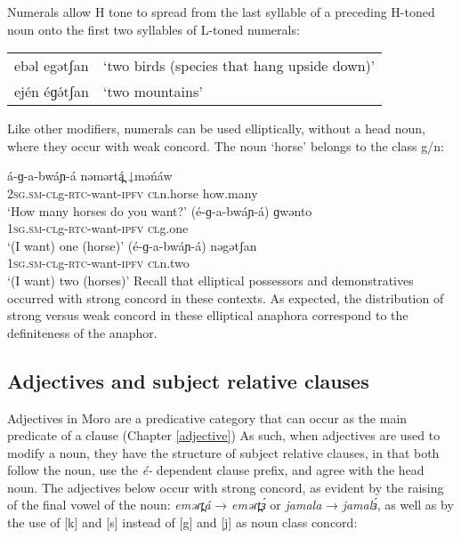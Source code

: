 Numerals allow H tone to spread from the last syllable of a preceding H-toned noun onto the first two syllables of L-toned numerals:

\ea \begin{tabular}[t]{ll}
	 ebəl egətʃan &	‘two birds (species that hang upside down)’ \\
	 ején éɡə́tʃan &	‘two mountains’ 	 \\
 \end{tabular}
 \z 


Like other modifiers, numerals can be used elliptically, without a head noun, where they occur with weak concord. The noun ‘horse’ belongs to the class g/n:

\ea 
	\ea \gll	á-ɡ-a-bwáɲ-á 				nəmərtá̪ 	↓məńáw\\
				2\textsc{sg}.\textsc{sm}-\textsc{cl}g-\textsc{rtc}-want-\textsc{\textsc{ipfv}} 	\textsc{cl}n.horse 	how.many\\
		\glt 	‘How many horses do you want?’
	\ex	\gll	(é-ɡ-a-bwáɲ-á) 				ɡwənto\\
				1\textsc{sg}.\textsc{sm}-\textsc{cl}g-\textsc{rtc}-want-\textsc{\textsc{ipfv}}	\textsc{cl}g.one\\
		\glt 	‘(I want) one (horse)’
	\ex	\gll 	(é-ɡ-a-bwáɲ-á) 				nəgətʃan\\
				1\textsc{sg}.\textsc{sm}-\textsc{cl}g-\textsc{rtc}-want-\textsc{\textsc{ipfv}}	\textsc{cl}n.two\\
		\glt 	‘(I want) two (horses)’
	\z 
\z
Recall that elliptical possessors and demonstratives occurred with strong concord in these contexts. As expected, the distribution of strong versus weak concord in these elliptical anaphora correspond to the definiteness of the anaphor.



\subsection{Adjectives and subject relative clauses}\label{section:adjsubrelative}

Adjectives in Moro are a predicative category that can occur as the main predicate of a clause (Chapter \ref{adjective}) As such, when adjectives are used to modify a noun, they have the structure of subject relative clauses, in that both follow the noun, use the \textit{é-} dependent clause prefix, and agree with the head noun. The adjectives below occur with strong concord, as evident by the raising of the final vowel of the noun: \textit{eməɾt̪á} → \textit{eməɾt̪ɜ́}  or \textit{jamala} → \textit{jamalɜ́}, as well as by the use of [k] and [s] instead of [g] and [j] as noun class concord:

